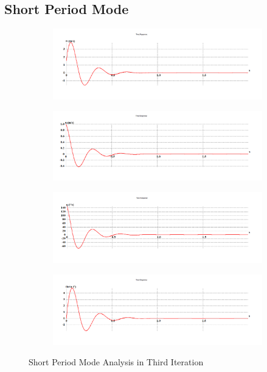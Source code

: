 \subsection{Short Period Mode}
\begin{figure}[H]
\begin{subfigure}{0.48\textwidth}
\includegraphics[width = \linewidth]{w2.png}
\end{subfigure}
\begin{subfigure}{0.48\textwidth}
\includegraphics[width = \linewidth]{u2.png}
\end{subfigure}
\medskip
\begin{subfigure}{0.48\textwidth}
\includegraphics[width = \linewidth]{q2.png}
\end{subfigure}
\begin{subfigure}{0.48\textwidth}
\includegraphics[width = \linewidth]{theta2.png}
\end{subfigure}
\caption{Short Period Mode Analysis in Third Iteration}
\end{figure}
